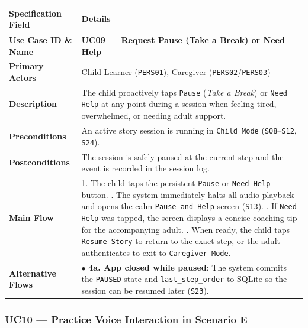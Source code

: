 \noindent\begin{xltabular}{\textwidth}{|p{4.0cm}|X|}
\hline
\textbf{Specification Field} & \textbf{Details} \\ \hline
\endhead
\textbf{Use Case ID \& Name} & \textbf{UC09 — Request Pause (Take a Break) or Need Help} \\ \hline
\textbf{Primary Actors} & Child Learner (\texttt{PERS01}), Caregiver (\texttt{PERS02}/\texttt{PERS03}) \\ \hline
\textbf{Description} & The child proactively taps \texttt{Pause} (\textit{Take a Break}) or \texttt{Need Help} at any point during a session when feeling tired, overwhelmed, or needing adult support. \\ \hline
\textbf{Preconditions} & An active story session is running in \texttt{Child Mode} (\texttt{S08}–\texttt{S12}, \texttt{S24}). \\ \hline
\textbf{Postconditions} & The session is safely paused at the current step and the event is recorded in the session log. \\ \hline
\textbf{Main Flow} & 1. The child taps the persistent \texttt{Pause} or \texttt{Need Help} button. . The system immediately halts all audio playback and opens the calm \texttt{Pause and Help} screen (\texttt{S13}). . If \texttt{Need Help} was tapped, the screen displays a concise coaching tip for the accompanying adult. . When ready, the child taps \texttt{Resume Story} to return to the exact step, or the adult authenticates to exit to \texttt{Caregiver Mode}. \\ \hline
\textbf{Alternative Flows} & $\bullet$ \textbf{4a. App closed while paused}: The system commits the \texttt{PAUSED} state and \texttt{last\_step\_order} to SQLite so the session can be resumed later (\texttt{S23}). \\ \hline
\end{xltabular}



\subsubsection{UC10 — Practice Voice Interaction in Scenario E}


